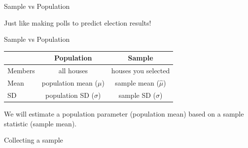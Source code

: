 \documentclass{beamer}\usepackage[]{graphicx}\usepackage[]{color}
\begin{document}
\begin{darkframes}
\begin{frame}[label=lists]{Sample vs Population}
   		
		Just like making polls to predict election results!
		
    \end{frame}    



    \begin{frame}[label=lists]{Sample vs Population}
    	
		
   		
		\begin{table}[!b]
        {\carlitoTLF %
        \begin{tabularx}{\textwidth}{Xcc}
          \textbf{} & \textbf{Population} & \textbf{Sample} \\
          \toprule
          Members       		 & all houses  & houses you selected  \\
          Mean               & population mean ($\mu$)    & sample mean ($\hat\mu$) \\
          SD & population SD ($\sigma$)   & sample SD ($\hat\sigma$) \\
          \bottomrule
        \end{tabularx}}
        
      \end{table} \pause
      \quad \newline    		
   		
   		We will estimate a \alert{population parameter} (population mean) based on a \alert{sample statistic} (sample mean).
		
		
    \end{frame}  
 

    \begin{frame}[label=lists]{Collecting a sample}
    

\end{frame}
\end{darkframes}
\end{document}
